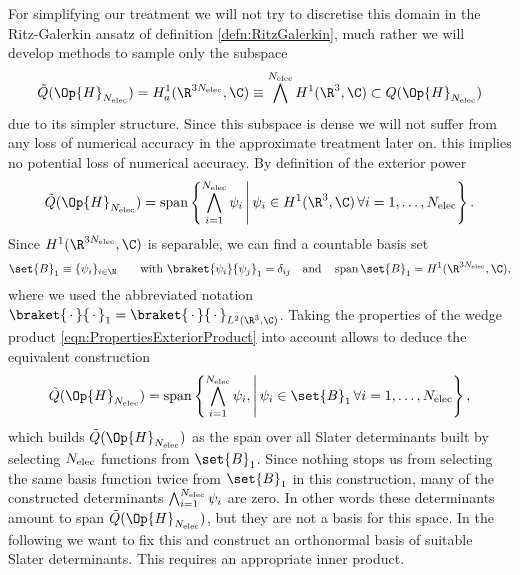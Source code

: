 For simplifying our treatment
we will not try to discretise this domain in the Ritz-Galerkin ansatz
of definition \ref{defn:RitzGalerkin},
much rather we will develop methods to sample only the subspace
\[ \tilde{Q}(\Op{H}_{\Nelec}) = H^1_a(\R^{3\Nelec}, \C) \equiv \bigwedge^{\Nelec} H^1(\R^3, \C) \subset Q(\Op{H}_{\Nelec}) \]
due to its simpler structure.
Since this subspace is dense we will not suffer from any loss of numerical
accuracy in the approximate treatment later on.
this implies no potential loss of numerical accuracy.
By definition of the exterior power
\begin{equation}
	\tilde{Q}(\Op{H}_{\Nelec}) = \spacespan \left\{
		\bigwedge_{i=1}^{\Nelec} \psi_i
		\, \middle| \,
		\psi_i \in H^1(\R^3, \C) \, \forall i = 1, \ldots, \Nelec
	\right\}.
	\label{eqn:FormDomainAllFunctions}
\end{equation}
Since $H^1(\R^{3\Nelec}, \C)$ is separable, we can find a countable basis set
\begin{equation}
	\set{B}_1 \equiv \{\psi_i\}_{i \in \N} \qquad \text{with }
	\braket{\psi_i}{\psi_j}_1 = \delta_{ij}
	\quad \text{and} \quad \spacespan \set{B}_1 = H^1(\R^{3\Nelec}, \C),
	\label{eqn:OneParticleBasis}
\end{equation}
where we used the abbreviated notation
$\braket{\slot}{\slot}_1 = \braket{\slot}{\slot}_{L^2(\R^3, \C)}$.
Taking the properties of the wedge product \eqref{eqn:PropertiesExteriorProduct}
into account allows to deduce the equivalent construction
\begin{equation}
	\label{eqn:FormDomainSlaterDeterminants}
	\tilde{Q}(\Op{H}_{\Nelec}) = \spacespan
	\left\{ \bigwedge_{i=1}^{\Nelec} \psi_i
	, \middle| \, \psi_i \in \set{B}_1 \, \forall i=1,\ldots,\Nelec
	\right\},
\end{equation}
which builds $\tilde{Q}(\Op{H}_{\Nelec})$ as the span
over all Slater determinants built by selecting
$N_\text{elec}$ functions from $\set{B}_1$.
Since nothing stops us from selecting the same basis function
twice from $\set{B}_1$ in this construction,
many of the constructed determinants $\bigwedge_{i=1}^{N_\text{elec}} \psi_i$
are zero.
In other words these determinants amount to span $\tilde{Q}(\Op{H}_{\Nelec})$,
but they are not a basis for this space.
In the following we want to fix this and construct an orthonormal basis
of suitable Slater determinants.
This requires an appropriate inner product.
